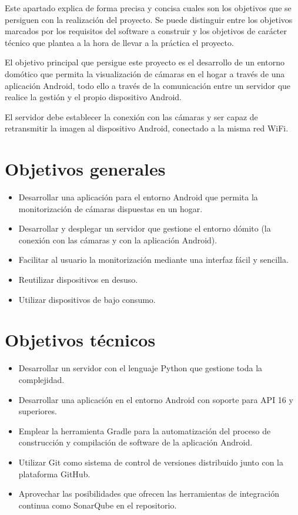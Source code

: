 
Este apartado explica de forma precisa y concisa cuales son los objetivos que se persiguen con la realización del proyecto. Se puede distinguir entre los objetivos marcados por los requisitos del software a construir y los objetivos de carácter técnico que plantea a la hora de llevar a la práctica el proyecto.

El objetivo principal que persigue este proyecto es el desarrollo de un entorno domótico que permita la visualización de cámaras en el hogar a través de una aplicación Android, todo ello a través de la comunicación entre un servidor que realice la gestión y el propio dispositivo Android.

El servidor debe establecer la conexión con las cámaras y ser capaz de retransmitir la imagen al dispositivo Android, conectado a la misma red WiFi. 

\section{Objetivos generales}\label{objetivos-generales}

\begin{itemize}
\tightlist
\item
  Desarrollar una aplicación para el entorno Android que permita la monitorización de cámaras dispuestas en un hogar.
\item
  Desarrollar y desplegar un servidor que gestione el entorno dómito (la conexión con las cámaras y con la aplicación Android).
\item
  Facilitar al usuario la monitorización mediante una interfaz fácil y sencilla.
\item
  Reutilizar dispositivos en desuso.
\item
  Utilizar dispositivos de bajo consumo.
\end{itemize}

\section{Objetivos técnicos}\label{objetivos-tecnicos}

\begin{itemize}
\tightlist
\item
  Desarrollar un servidor con el lenguaje Python que gestione toda la complejidad.
\item
  Desarrollar una aplicación en el entorno Android con soporte para API 16 y superiores.
\item
  Emplear la herramienta Gradle para la automatización del proceso de construcción y compilación de software de la aplicación Android.
\item
  Utilizar Git como sistema de control de versiones distribuido junto con
la plataforma GitHub.
\item
  Aprovechar las posibilidades que ofrecen las herramientas de integración continua como SonarQube en el repositorio.
\end{itemize}

